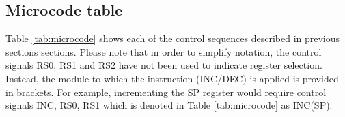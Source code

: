 \subsection{Microcode table}
Table \ref{tab:microcode} shows each of the control sequences described in previous sections sections. Please note that in order to simplify notation, the control signals RS0, RS1 and RS2 have not been used to indicate register selection. Instead, the module to which the instruction (INC/DEC) is applied is provided in brackets. For example, incrementing the SP register would require control signals INC, RS0, RS1 which is denoted in Table \ref{tab:microcode} as INC(SP).






